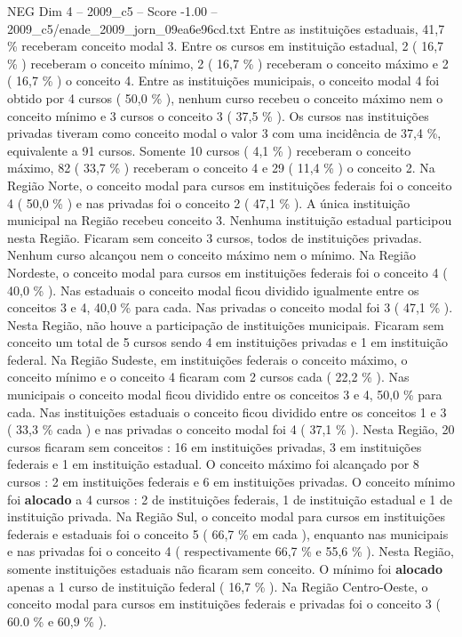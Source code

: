 \begin{textsample}{NEG Dim 4 – 2009\_c5 – Score -1.00 – 2009\_c5/enade\_2009\_jorn\_09ea6e96cd.txt}
Entre as instituições estaduais, 41,7 \% receberam conceito modal 3.
Entre os cursos em instituição estadual, 2 ( 16,7 \% ) receberam o conceito mínimo, 2 ( 16,7 \% ) receberam o conceito máximo e 2 ( 16,7 \% ) o conceito 4.
Entre as instituições municipais, o conceito modal 4 foi obtido por 4 cursos ( 50,0 \% ), nenhum curso recebeu o conceito máximo nem o conceito mínimo e 3 cursos o conceito 3 ( 37,5 \% ).
Os cursos nas instituições privadas tiveram como conceito modal o valor 3 com uma incidência de 37,4 \%, equivalente a 91 cursos.
Somente 10 cursos ( 4,1 \% ) receberam o conceito máximo, 82 ( 33,7 \% ) receberam o conceito 4 e 29 ( 11,4 \% ) o conceito 2.
Na Região Norte, o conceito modal para cursos em instituições federais foi o conceito 4 ( 50,0 \% ) e nas privadas foi o conceito 2 ( 47,1 \% ).
A única instituição municipal na Região recebeu conceito 3.
Nenhuma instituição estadual participou nesta Região.
Ficaram sem conceito 3 cursos, todos de instituições privadas.
Nenhum curso alcançou nem o conceito máximo nem o mínimo.
Na Região Nordeste, o conceito modal para cursos em instituições federais foi o conceito 4 ( 40,0 \% ).
Nas estaduais o conceito modal ficou dividido igualmente entre os conceitos 3 e 4, 40,0 \% para cada.
Nas privadas o conceito modal foi 3 ( 47,1 \% ).
Nesta Região, não houve a participação de instituições municipais.
Ficaram sem conceito um total de 5 cursos sendo 4 em instituições privadas e 1 em instituição federal.
Na Região Sudeste, em instituições federais o conceito máximo, o conceito mínimo e o conceito 4 ficaram com 2 cursos cada ( 22,2 \% ).
Nas municipais o conceito modal ficou dividido entre os conceitos 3 e 4, 50,0 \% para cada.
Nas instituições estaduais o conceito ficou dividido entre os conceitos 1 e 3 ( 33,3 \% cada ) e nas privadas o conceito modal foi 4 ( 37,1 \% ).
Nesta Região, 20 cursos ficaram sem conceitos : 16 em instituições privadas, 3 em instituições federais e 1 em instituição estadual.
O conceito máximo foi alcançado por 8 cursos : 2 em instituições federais e 6 em instituições privadas.
O conceito mínimo foi \textbf{alocado} a 4 cursos : 2 de instituições federais, 1 de instituição estadual e 1 de instituição privada.
Na Região Sul, o conceito modal para cursos em instituições federais e estaduais foi o conceito 5 ( 66,7 \% em cada ), enquanto nas municipais e nas privadas foi o conceito 4 ( respectivamente 66,7 \% e 55,6 \% ).
Nesta Região, somente instituições estaduais não ficaram sem conceito.
O mínimo foi \textbf{alocado} apenas a 1 curso de instituição federal ( 16,7 \% ).
Na Região Centro-Oeste, o conceito modal para cursos em instituições federais e privadas foi o conceito 3 ( 60.0 \% e 60,9 \% ).

\end{textsample}
